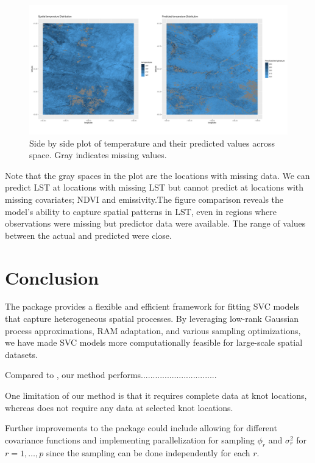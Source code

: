  
 \begin{figure}[H]
 \centering
 \includegraphics[width=\textwidth]{../../figures/predictions.png}
 \caption{Side by side plot of temperature and their predicted values across space. Gray indicates missing values.}
 \label{fig:predicted temperature}
 \end{figure}
 
 Note that the gray spaces in the plot are the locations with missing data. We can predict LST at locations with missing LST but cannot predict at locations with missing covariates; NDVI and emissivity.The figure comparison reveals the model’s ability to capture spatial patterns in LST, even in regions where observations were missing but predictor data were available.
 The range of values between the actual and predicted were close.
 
\section{Conclusion}
\label{sec:Conclusion}
The  package provides a flexible and efficient framework for fitting SVC models that capture heterogeneous spatial processes. By leveraging low-rank Gaussian process approximations, RAM adaptation, and various sampling optimizations, we have made SVC models more computationally feasible for large-scale spatial datasets.

Compared to , our method performs................................

One limitation of our method is that it requires complete data at knot locations, whereas  does not require any data at selected knot locations.

Further improvements to the package could include allowing for different covariance functions and implementing parallelization for sampling $\phi_r$ and $\sigma_r^2$ for $r = 1, \dots, p$ since the sampling can be done independently for each $r$.

\newpage




 
